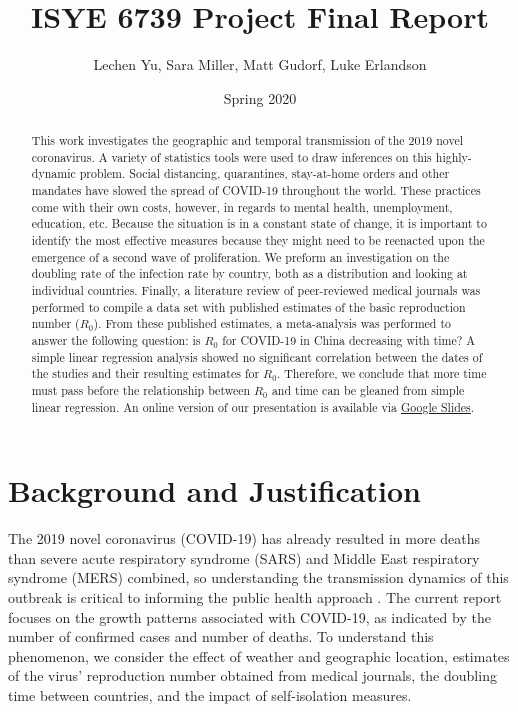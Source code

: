 \documentclass{article}
\title{ISYE 6739 Project Final Report}
\author{Lechen Yu, Sara Miller, Matt Gudorf, Luke Erlandson}
\date{Spring 2020}
\begin{document}
\maketitle

\begin{abstract}

This work investigates the geographic and temporal transmission of the 2019 novel coronavirus. A variety of statistics tools were used to draw inferences on this highly-dynamic problem. %
Social distancing, quarantines, stay-at-home orders and other mandates have slowed the spread of COVID-19 throughout the world. These practices come with their own costs, however, in regards to mental health, unemployment, education, etc. Because the situation is in a constant state of change, it is important to identify the most effective measures because they might need to be reenacted upon the emergence of a second wave of proliferation.
We preform an investigation on the doubling rate of the infection rate by country, both as a distribution and looking at individual countries.
Finally, a literature review of peer-reviewed medical journals was performed to compile a data set with published estimates of the basic reproduction number ($R_0$). From these published estimates, a meta-analysis was performed to answer the following question: is $R_0$ for COVID-19 in China decreasing with time? A simple linear regression analysis showed no significant correlation between the dates of the studies and their resulting estimates for $R_0$. Therefore, we conclude that more time must pass before the relationship between $R_0$ and time can be gleaned from simple linear regression. An online version of our presentation is available via \href{https://docs.google.com/presentation/d/17ZegWwXkD2-FEV-3EgUg825KnwtbHrZZuWgpTryxcOs/edit?usp=sharing}{Google Slides}.

\end{abstract}
\tableofcontents

\section{Background and Justification}

The 2019 novel coronavirus (COVID-19) has already resulted in more deaths than severe acute respiratory syndrome (SARS) and Middle East respiratory syndrome (MERS) combined, so understanding the transmission dynamics of this outbreak is critical to informing the public health approach \cite{1}. The current report focuses on the growth patterns associated with COVID-19, as indicated by the number of confirmed cases and number of deaths. To understand this phenomenon, we consider the effect of weather and geographic location, estimates of the virus' reproduction number obtained from medical journals, the doubling time between countries, and the impact of self-isolation measures. 
\end{document}
